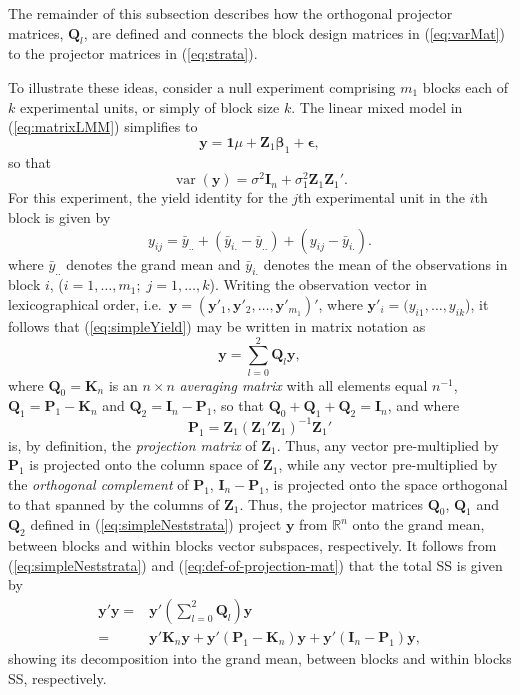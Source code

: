 \documentclass[article]{jss}
\newcommand{\mP}{\mathbf{P}}
\newcommand{\I}{\mathbf{I}}
\newcommand{\K}{\mathbf{K}}
\newcommand{\Z}{\mathbf{Z}}
\newcommand{\Q}{\mathbf{Q}}
\begin{document}
The remainder of this subsection describes how the orthogonal projector matrices, $\Q_l$, are defined and connects the block design matrices in (\ref{eq:varMat}) to the projector matrices in (\ref{eq:strata}).

To illustrate these ideas, consider a null experiment comprising $m_1$ blocks each of $k$ experimental units, or simply of block size $k$. The linear mixed model in (\ref{eq:matrixLMM}) simplifies to 
\begin{equation}
\label{eq:nullexpt-LM}
\bm{y} = \mathbf{1}\mu + \Z_1\bm{\beta}_1 + \bm{\epsilon},
\end{equation}
so that 
\[
\operatorname{var}(\bm{y}) = \sigma^2\I_n + \sigma_1^2 \Z_1\Z_1'.
\]
For this experiment, the yield identity for the $j$th experimental unit in the $i$th block is given by
\begin{equation}\label{eq:simpleYield}
y_{ij} = \bar{y}_{..} + (\bar{y}_{i.} - \bar{y}_{..}) + (y_{ij} - \bar{y}_{i.}).
\end{equation}
where $\bar{y}_{..}$ denotes the grand mean and $\bar{y}_{i.}$ denotes the mean of the observations in block $i$, ($i = 1, \dots, m_1;\; j = 1, \dots, k $). Writing the observation vector in lexicographical order, i.e.\ $\bm{y}=(\bm{y}'_1,\bm{y}'_2,\ldots,\bm{y}'_{m_1})'$, where $\bm{y}'_i=(y_{i1},\ldots,y_{ik}$), it follows that (\ref{eq:simpleYield}) may be written in matrix notation as 
\begin{equation}\label{eq:simpleNeststrata}
\bm{y} = \sum_{l=0}^{2} \Q_l \bm{y},
\end{equation}
where $\Q_{0}=\K_{n}$ is an $n \times n$ \emph{averaging matrix} with all elements equal $n^{-1}$,  $\Q_1 = \mP_1-\K_n$ and $\Q_2 = \I_n - \mP_1$, so that $\Q_0+\Q_1+\Q_2=\I_n$, and where 
\begin{equation}\label{eq:def-of-projection-mat}
\mP_1 = \Z_{1}(\Z_{1}'\Z_{1})^{-1}\Z_{1}'
\end{equation} 
is, by definition, the \emph{projection matrix} of $\Z_{1}$. Thus, any vector pre-multiplied by $\mP_1$ is projected onto the column space of $\Z_{1}$, while any vector pre-multiplied by the \emph{orthogonal complement} of $\mP_1$, $\I_{n} - \mP_1$, is projected onto the space orthogonal to that spanned by the columns of  $\Z_{1}$. Thus, the projector matrices $\Q_0$, $\Q_1$ and $\Q_2$ defined in (\ref{eq:simpleNeststrata}) project $\bm{y}$ from $\mathbb{R}^n$ onto the grand mean, between blocks and within blocks vector subspaces, respectively. It follows from (\ref{eq:simpleNeststrata}) and (\ref{eq:def-of-projection-mat}) that the total SS is given by
\begin{align}
\bm{y}'\bm{y} = & \bm{y}' \left(\sum_{l=0}^{2} \Q_l\right)\bm{y} \label{eq:infoDecomp1a} \\
              = & \bm{y}'\K_n\bm{y} + \bm{y}'(\mP_{1}-\K_n)\bm{y} + \bm{y}'(\I_n - \mP_{1})\bm{y}, \label{eq:infoDecomp1b}
\end{align}
showing its decomposition into the grand mean, between blocks and within blocks SS, respectively.
\end{document}
